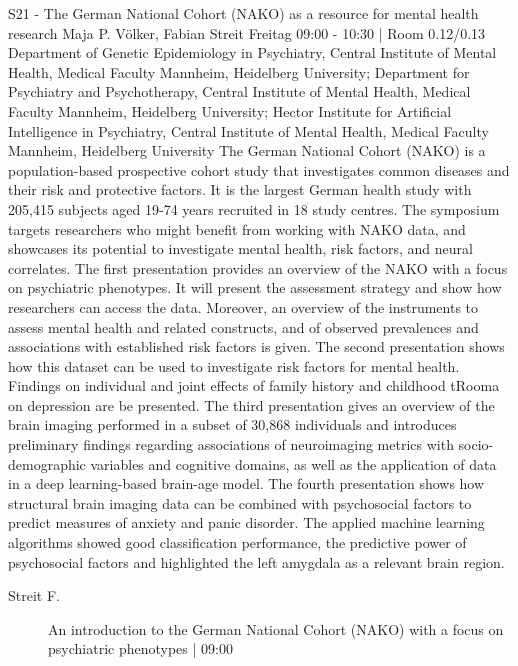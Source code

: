 
            \begin{symposium}
            {S21 - The German National Cohort (NAKO) as a resource for mental health research}
            {Maja P. Völker, Fabian Streit}
            {Freitag 09:00 - 10:30 | Room 0.12/0.13}
            {Department of Genetic Epidemiology in Psychiatry, Central Institute of Mental Health, Medical Faculty Mannheim, Heidelberg University; Department for Psychiatry and Psychotherapy, Central Institute of Mental Health, Medical Faculty Mannheim, Heidelberg University; Hector Institute for Artificial Intelligence in Psychiatry, Central Institute of Mental Health, Medical Faculty Mannheim, Heidelberg University}
            The German National Cohort (NAKO) is a population-based prospective cohort study that investigates common diseases and their risk and protective factors. It is the largest German health study with 205,415 subjects aged 19-74 years recruited in 18 study centres. The symposium targets researchers who might benefit from working with NAKO data, and showcases its potential to investigate mental health, risk factors, and neural correlates. The first presentation provides an overview of the NAKO with a focus on psychiatric phenotypes. It will present the assessment strategy and show how researchers can access the data. Moreover, an overview of the instruments to assess mental health and related constructs, and of observed prevalences and associations with established risk factors is given. The second presentation shows how this dataset can be used to investigate risk factors for mental health. Findings on individual and joint effects of family history and childhood tRooma on depression are be presented. The third presentation gives an overview of the brain imaging performed in a subset of 30,868 individuals and introduces preliminary findings regarding associations of neuroimaging metrics with socio-demographic variables and cognitive domains, as well as the application of data in a deep learning-based brain-age model. The fourth presentation shows how structural brain imaging data can be combined with psychosocial factors to predict measures of anxiety and panic disorder. The applied machine learning algorithms showed good classification performance, the predictive power of psychosocial factors and highlighted the left amygdala as a relevant brain region.
            \begin{description}    
            
                \item [ Streit F.] An introduction to the German National Cohort (NAKO) with a focus on psychiatric phenotypes \textcolor{mygray}{ | 09:00}    
                

\end{description}
\end{symposium}
